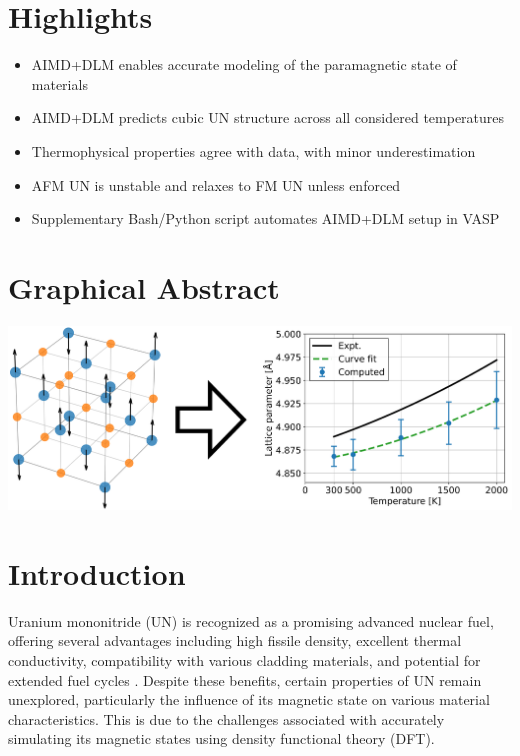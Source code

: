 \documentclass[preprint, 12pt]{elsarticle}
\newcommand{\?}{\stackrel{?}{=}}
\begin{document}
\newpage

\section*{Highlights}
\begin{itemize}
\item AIMD+DLM enables accurate modeling of the paramagnetic state of materials
\item AIMD+DLM predicts cubic UN structure across all considered temperatures
\item Thermophysical properties agree with data, with minor underestimation
\item AFM UN is unstable and relaxes to FM UN unless enforced
\item Supplementary Bash/Python script automates AIMD+DLM setup in VASP
\end{itemize}

\section*{Graphical Abstract}
\begin{center}
\includegraphics[width=\textwidth]{GraphicalAbstract.png}
\end{center}

\newpage


\section{Introduction}

Uranium mononitride (UN) is recognized as a promising advanced nuclear fuel, offering several advantages including high fissile density, excellent thermal conductivity, compatibility with various cladding materials, and potential for extended fuel cycles \cite{Wallenius2020, Uno2020}. Despite these benefits, certain properties of UN remain unexplored, particularly the influence of its magnetic state on various material characteristics. This is due to the challenges associated with accurately simulating its magnetic states using density functional theory (DFT).
\end{document}
